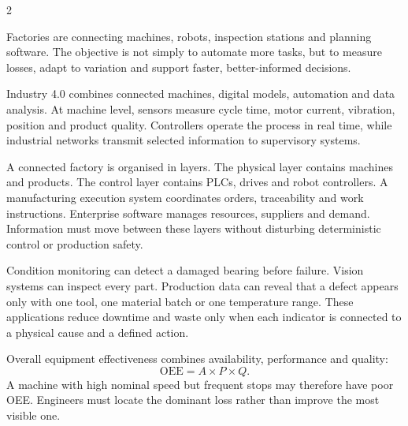 

\begin{multicols}{2}
\begin{engineeringnews}
Factories are connecting machines, robots, inspection stations and planning software. The objective is
not simply to automate more tasks, but to measure losses, adapt to variation and support faster,
better-informed decisions.
\end{engineeringnews}

\begin{ecarticle}
Industry 4.0 combines connected machines, digital models, automation and data analysis. At machine
level, sensors measure cycle time, motor current, vibration, position and product quality. Controllers
operate the process in real time, while industrial networks transmit selected information to
supervisory systems.

A connected factory is organised in layers. The physical layer contains machines and products. The
control layer contains PLCs, drives and robot controllers. A manufacturing execution system coordinates
orders, traceability and work instructions. Enterprise software manages resources, suppliers and demand.
Information must move between these layers without disturbing deterministic control or production safety.

Condition monitoring can detect a damaged bearing before failure. Vision systems can inspect every
part. Production data can reveal that a defect appears only with one tool, one material batch or one
temperature range. These applications reduce downtime and waste only when each indicator is connected
to a physical cause and a defined action.

Overall equipment effectiveness combines availability, performance and quality:
\[
\mathrm{OEE}=A\times P\times Q.
\]
A machine with high nominal speed but frequent stops may therefore have poor OEE. Engineers must locate
the dominant loss rather than improve the most visible one.


\end{ecarticle}
\end{multicols}
